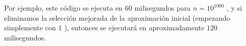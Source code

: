 Por ejemplo, este código se ejecuta en $60$ milisegundos para $n = 10^{1000}$ , y si eliminamos la selección mejorada de la aproximación inicial (empezando simplemente con $1$ ), entonces se ejecutará en aproximadamente $120$ milisegundos.